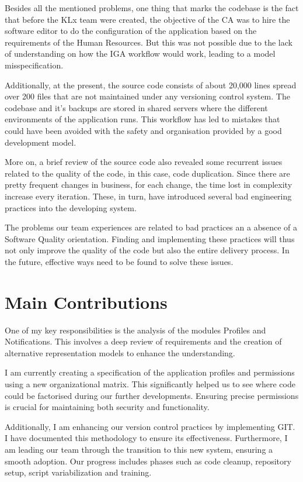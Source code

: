 Besides all the mentioned problems, one thing that marks the codebase is the fact that before the KLx team were created, the objective of the CA was to hire the software editor to do the configuration of the application based on the requirements of the Human Resources. But this was not possible due to the lack of understanding on how the IGA workflow would work, leading to a model misspecification. 

Additionally, at the present, the source code consists of about 20,000 lines spread over 200 files that are not maintained under any versioning control system. The codebase and it's backups are stored in shared servers where the different environments of the application runs. This workflow has led to mistakes that could have been avoided with the safety and organisation provided by a good development model.

More on, a brief review of the source code also revealed some recurrent issues related to the quality of the code, in this case, code duplication. Since there are pretty frequent changes in business, for each change, the time lost in complexity increase every iteration. These, in turn, have introduced several bad engineering practices into the developing system.

The problems our team experiences are related to bad practices an a absence of a Software Quality orientation. Finding and implementing these practices will thus not only improve the quality of the code but also the entire delivery process. In the future, effective ways need to be found to solve these issues.

\section{Main Contributions}

One of my key responsibilities is the analysis of the modules Profiles and Notifications. This involves a deep review of requirements and the creation of alternative representation models to enhance the understanding.

I am currently creating a specification of the application profiles and permissions using a new organizational matrix. This significantly helped us to see where code could be factorised during our further developments. Ensuring precise permissions is crucial for maintaining both security and functionality.

Additionally, I am enhancing our version control practices by implementing GIT. I have documented this methodology to ensure its effectiveness. Furthermore, I am leading our team through the transition to this new system, ensuring a smooth adoption. Our progress includes phases such as code cleanup, repository setup, script variabilization and training.

